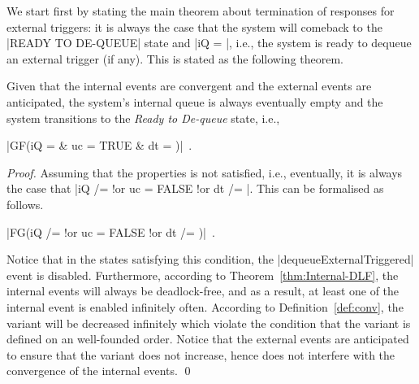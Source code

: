 We start first by stating the main theorem about termination of
responses for external triggers: it is always the case that the system
will comeback to the |READY TO DE-QUEUE| state and |iQ = {}|, i.e.,
the system is ready to dequeue an external trigger (if any).  This is
stated as the following theorem.
\begin{theorem}
  \label{thm:finite-internal-events}
  Given that the internal events are convergent and the external
  events are anticipated, the system's internal queue is always
  eventually empty and the system transitions to the \emph{Ready to
    De-queue} state, i.e.,
  \begin{center}
    |GF(iQ = {} & uc = TRUE & dt = {})|~.
  \end{center}
\end{theorem}
\begin{proof}
  Assuming that the properties is not satisfied, i.e., eventually,
  it is always the case that %
  |iQ /= {} !or  uc = FALSE !or dt /=  {}|.  %
  This can be formalised as follows.
  \begin{center}
    |FG(iQ /= {} !or uc = FALSE !or dt /= {})|~.    
  \end{center}
  Notice that in the states satisfying this condition, the
  |dequeueExternalTriggered| event is disabled.  Furthermore, according
  to Theorem~\ref{thm:Internal-DLF}, the internal events
  will always be deadlock-free, and as a result, at least one
  of the internal event is enabled infinitely often. According to
  Definition~\ref{def:conv}, the variant will be decreased infinitely
  which violate the condition that the variant is defined on an
  well-founded order.  Notice that the external events are
  anticipated to ensure that the variant does not increase, hence
  does not interfere with the convergence of the internal events.
  \qed
\end{proof}

